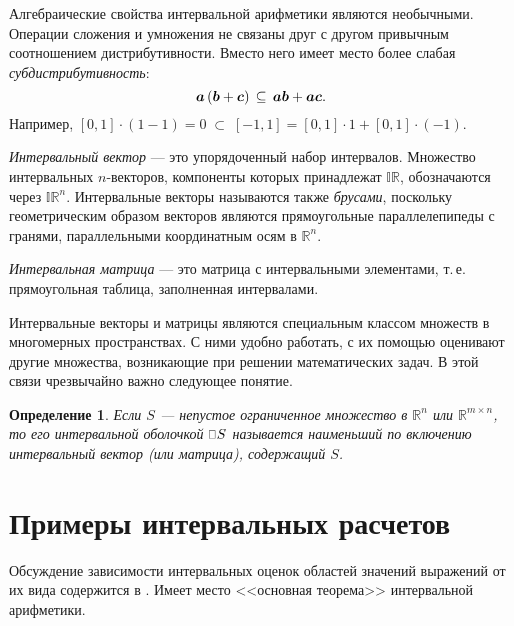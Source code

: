 \documentclass[a5paper,openany]{book}
\newcommand{\mbf}[1]{\protect\text{\boldmath$#1$}}
\newcommand{\mbb}{\mathbb}
\newcommand{\ih}{\scalebox{0.67}[0.87]{$\Box$\hspace*{1pt}}}
\newtheorem{definition}{Определение}[section]
\begin{document}
{{Алгебраические свойства интервальной арифметики
являются необычными. 
Операции сложения и умножения не связаны друг с другом привычным соотношением 
дистрибутивности. Вместо него имеет место более слабая \textit{субдистрибутивность}: 
\begin{equation*} 
	\index{субдистрибутивность} 
	\mbf{a}\,(\mbf{b} + \mbf{c}) \,\subseteq\, \mbf{a}\mbf{b} + \mbf{a}\mbf{c}. 
\end{equation*} 
Например, $[0, 1] \cdot (1 - 1) = 0 \;\subset\; [-1, 1] = [0, 1]\cdot 1 + [0, 1]\cdot(-1)$. 

\emph{Интервальный вектор} --- это упорядоченный набор интервалов. 
Множество интервальных $n$-векторов, 
компоненты которых принадлежат $\mbb{IR}$, обозначаются через $\mbb{IR}^n$. 
Интервальные векторы называются также \textit{брусами}, поскольку геометрическим 
образом векторов являются прямоугольные параллелепипеды с гранями, параллельными координатным 
осям в $\mbb{R}^n$. 

\emph{Интервальная матрица} --- это матрица с интервальными элементами, т.\,е. прямоугольная 
таблица, заполненная интервалами. 

Интервальные векторы и матрицы являются специальным классом 
множеств в многомерных пространствах. С ними  удобно работать, с их 
помощью оценивают другие множества, возникающие при решении математических задач. 
В этой связи чрезвычайно важно следующее понятие. 
\begin{definition}
	Если $S$ --- непустое ограниченное множество в $\mbb{R}^n$ или $\mbb{R}^{m\times n}$, 
	то его \textsl{интервальной оболочкой} $\ih S$ называется наименьший по включению 
	интервальный вектор (или матрица), содержащий $S$. 
\end{definition}

\section{Примеры интервальных расчетов} 


Обсуждение зависимости интервальных оценок областей значений выражений от их вида 
содержится в \cite{SSharyBook}.  Имеет место <<основная теорема>> интервальной арифметики.

}}
\end{document}
